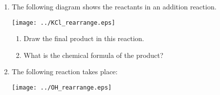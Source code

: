 {\begin{enumerate}
\item{The following diagram shows the reactants in an addition reaction.}

% 

\begin{center}
 \texttt{[image: ../KCl\_rearrange.eps]}
\end{center}



	\begin{enumerate}
	\item{Draw the final product in this reaction.}
	\item{What is the chemical formula of the product?}
	\end{enumerate}

\item{The following reaction takes place:}

% 

\begin{center}
 \texttt{[image: ../OH\_rearrange.eps]}
\end{center}



\end{enumerate}}
